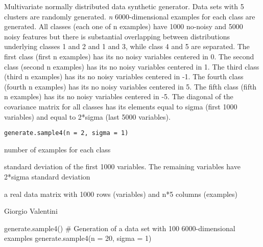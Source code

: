 \documentclass{article}
\begin{document}
\begin{Description}\relax
Multivariate normally  distributed data synthetic generator.
Data sets with 5 clusters are randomly generated.
\emph{n} 6000-dimensional examples for each class are generated.
All classes (each one of n examples) have 1000 no-noisy and 5000 noisy features but there is substantial overlapping 
between distributions underlying classes 1 and 2 and 1 and 3, while class 4 and 5 are separated.
The first class (first n examples) has its no noisy variables centered in 0.
The second class (second n examples) has its no noisy variables centered in 1. 
The third class (third n examples) has its no noisy variables centered in -1. 
The fourth class (fourth n examples) has its no noisy variables centered in 5.
The fifth class (fifth n examples) has its no noisy variables centered in -5.
The diagonal of the covariance matrix for all classes has its elements equal to sigma (first 1000 variables) and equal to
2*sigma (last 5000 variables).
\end{Description}
\begin{Usage}
\begin{verbatim}
generate.sample4(n = 2, sigma = 1)
\end{verbatim}
\end{Usage}
\begin{Arguments}
\begin{ldescription}
\item[\code{n}] number of examples for each class 
\item[\code{sigma}] standard deviation of the first 1000 variables. The remaining variables have 2*sigma standard deviation 
\end{ldescription}
\end{Arguments}
\begin{Value}
a real data matrix with 1000 rows (variables) and n*5 columns (examples)
\end{Value}
\begin{Author}\relax
Giorgio Valentini 
\end{Author}
\begin{Examples}
\begin{ExampleCode}
generate.sample4()
# Generation of a data set with 100 6000-dimensional examples
generate.sample4(n = 20, sigma = 1)
\end{ExampleCode}
\end{Examples}
\end{document}
